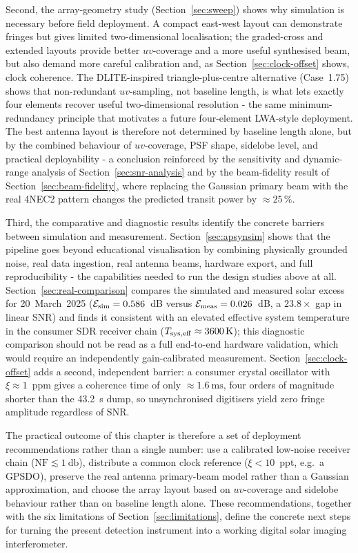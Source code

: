 Second, the array-geometry study (Section~\ref{sec:sweep}) shows why simulation is
necessary before field deployment. A compact east-west layout can demonstrate
fringes but gives limited two-dimensional localisation; the graded-cross and
extended layouts provide better $uv$-coverage and a more useful synthesised beam, but
also demand more careful calibration and, as Section~\ref{sec:clock-offset} shows,
clock coherence. The DLITE-inspired triangle-plus-centre alternative (Case~1.75) shows
that non-redundant $uv$-sampling, not baseline length, is what lets exactly four
elements recover useful two-dimensional resolution - the same minimum-redundancy
principle that motivates a future four-element LWA-style deployment. The best antenna
layout is therefore not determined by baseline length alone, but by the combined
behaviour of $uv$-coverage, PSF shape, sidelobe level, and practical deployability - a
conclusion reinforced by the sensitivity and dynamic-range analysis of
Section~\ref{sec:snr-analysis} and by the beam-fidelity result of
Section~\ref{sec:beam-fidelity}, where replacing the Gaussian primary beam with the
real 4NEC2 pattern changes the predicted transit power by $\approx25\,\%$.

Third, the comparative and diagnostic results identify the concrete barriers between
simulation and measurement. Section~\ref{sec:apsynsim} shows that the pipeline goes
beyond educational visualisation by combining physically grounded noise, real data
ingestion, real antenna beams, hardware export, and full reproducibility - the
capabilities needed to run the design studies above at all. Section~\ref{sec:real-comparison}
compares the simulated and measured solar excess for 20~March~2025
($\mathcal{E}_{\rm sim}=0.586$~dB versus $\mathcal{E}_{\rm meas}=0.026$~dB, a
$23.8\times$ gap in linear SNR) and finds it consistent with an elevated effective
system temperature in the consumer SDR receiver chain
($T_{\rm sys,eff}\approx\SI{3\,600}{\kelvin}$); this diagnostic comparison should not
be read as a full end-to-end hardware validation, which would require an
independently gain-calibrated measurement. Section~\ref{sec:clock-offset} adds a
second, independent barrier: a consumer crystal oscillator with
$\xi\approx1$~ppm gives a coherence time of only $\approx\SI{1.6}{\milli\second}$,
four orders of magnitude shorter than the \SI{43.2}{\second} dump, so unsynchronised
digitisers yield zero fringe amplitude regardless of SNR.

The practical outcome of this chapter is therefore a set of deployment
recommendations rather than a single number: use a calibrated low-noise receiver
chain ($\mathrm{NF}\lesssim\SI{1}{\decibel}$), distribute a common clock reference
($\xi<10$~ppt, e.g.\ a GPSDO), preserve the real antenna primary-beam model
rather than a Gaussian approximation, and choose the array layout based on
$uv$-coverage and sidelobe behaviour rather than on baseline length alone. These
recommendations, together with the six limitations of Section~\ref{sec:limitations},
define the concrete next steps for turning the present detection instrument into a
working digital solar imaging interferometer.
\clearpage
